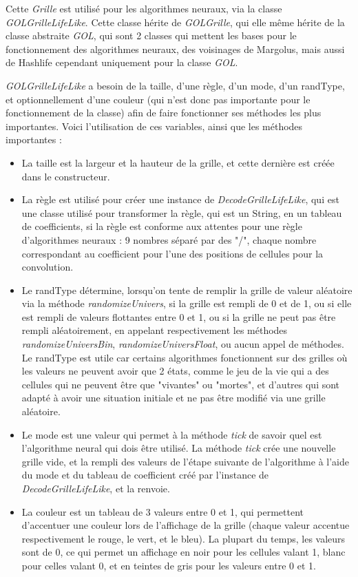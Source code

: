 \par Cette \textit{Grille} est utilisé pour les algorithmes neuraux, via la classe \textit{GOLGrilleLifeLike}. Cette classe hérite de \textit{GOLGrille}, qui elle même hérite de la classe abstraite \textit{GOL}, qui sont 2 classes qui mettent les bases pour le fonctionnement des algorithmes neuraux, des voisinages de Margolus, mais aussi de Hashlife cependant uniquement pour la classe \textit{GOL}.

\par \textit{GOLGrilleLifeLike} a besoin de la taille, d'une règle, d'un mode, d'un randType, et optionnellement d'une couleur (qui n'est donc pas importante pour le fonctionnement de la classe) afin de faire fonctionner ses méthodes les plus importantes. Voici l'utilisation de ces variables, ainsi que les méthodes importantes :
\begin{itemize}
    \item La taille est la largeur et la hauteur de la grille, et cette dernière est créée dans le constructeur.
    \item La règle est utilisé pour créer une instance de \textit{DecodeGrilleLifeLike}, qui est une classe utilisé pour transformer la règle, qui est un String, en un tableau de coefficients, si la règle est conforme aux attentes pour une règle d'algorithmes neuraux : 9 nombres séparé par des "/", chaque nombre correspondant au coefficient pour l'une des positions de cellules pour la convolution.
    \item Le randType détermine, lorsqu'on tente de remplir la grille de valeur aléatoire via la méthode \textit{randomizeUnivers}, si la grille est rempli de 0 et de 1, ou si elle est rempli de valeurs flottantes entre 0 et 1, ou si la grille ne peut pas être rempli aléatoirement, en appelant respectivement les méthodes \textit{randomizeUniversBin}, \textit{randomizeUniversFloat}, ou aucun appel de méthodes. Le randType est utile car certains algorithmes fonctionnent sur des grilles où les valeurs ne peuvent avoir que 2 états, comme le jeu de la vie qui a des cellules qui ne peuvent être que "vivantes" ou "mortes", et d'autres qui sont adapté à avoir une situation initiale et ne pas être modifié via une grille aléatoire.
    \item Le mode est une valeur qui permet à la méthode \textit{tick} de savoir quel est l'algorithme neural qui dois être utilisé. La méthode \textit{tick} crée une nouvelle grille vide, et la rempli des valeurs de l'étape suivante de l'algorithme à l'aide du mode et du tableau de coefficient créé par l'instance de \textit{DecodeGrilleLifeLike}, et la renvoie.
    \item La couleur est un tableau de 3 valeurs entre 0 et 1, qui permettent d'accentuer une couleur lors de l'affichage de la grille (chaque valeur accentue respectivement le rouge, le vert, et le bleu). La plupart du temps, les valeurs sont de 0, ce qui permet un affichage en noir pour les cellules valant 1, blanc pour celles valant 0, et en teintes de gris pour les valeurs entre 0 et 1.
\end{itemize}

